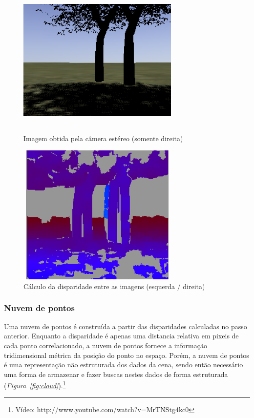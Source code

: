 \documentclass{article}
\newcommand{\foot}[1]{\footnote{	\fontfamily{cmss}\selectfont\footnotesize{#1}}}
\newcommand{\fig}[1]{\textit{Figura~\ref{#1}}}
\begin{document}
\begin{figure}[ht]
	\begin{minipage}[b]{0.4\linewidth}
	    \centering
	    \includegraphics[width=8cm,height=7cm,]{../images/arq_image.png}
	 	\caption{Imagem obtida pela câmera estéreo (somente direita)}
	 	\label{fig:virt}
	\end{minipage}
	\hspace{1cm}
	\begin{minipage}[b]{0.4\linewidth}
	    \centering
	    \includegraphics[width=8cm,height=7cm,]{../images/arq_disp.png}
	 	\caption{Cálculo da disparidade entre as imagens (esquerda / direita)}
	 	\label{fig:disp}
	\end{minipage}
\end{figure}


\subsubsection{Nuvem de pontos}

Uma nuvem de pontos é construída a partir das disparidades calculadas no passo
anterior. Enquanto a disparidade é apenas uma distancia relativa em pixeis de
cada ponto correlacionado, a nuvem de pontos fornece a informação tridimensional
métrica da posição do ponto no espaço. Porém, a nuvem de pontos é uma
representação não estruturada dos dados da cena, sendo então necessário uma
forma de armazenar e fazer buscas nestes dados de forma estruturada
(\fig{fig:cloud}).\foot{Vídeo: http://www.youtube.com/watch?v=MrTNStg4kc0}
\end{document}
